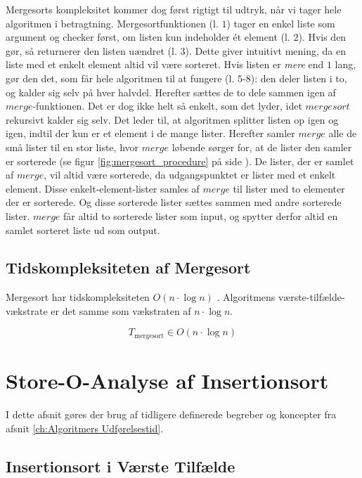 Mergesorts kompleksitet kommer dog først rigtigt til udtryk, når vi tager hele algoritmen i betragtning. Mergesortfunktionen (l. $1$) tager en enkel liste som argument og checker først, om listen kun indeholder ét element (l. $2$). Hvis den gør, så returnerer den listen uændret (l. $3$). Dette giver intuitivt mening, da en liste med et enkelt element altid vil være sorteret. Hvis listen er \emph{mere} end $1$ lang, gør den det, som får hele algoritmen til at fungere (l. $5$-$8$): den deler listen i to, og kalder sig selv på hver halvdel. Herefter sættes de to dele sammen igen af $merge$-funktionen. Det er dog ikke helt så enkelt, som det lyder, idet $mergesort$ rekursivt kalder sig selv. Det leder til, at algoritmen splitter listen op igen og igen, indtil der kun er et element i de mange lister. Herefter samler $merge$ alle de små lister til en stor liste, hvor $merge$ løbende sørger for, at de lister den samler er sorterede (se figur \ref{fig:mergesort_procedure} på side \pageref{fig:mergesort_procedure}). De lister, der er samlet af $merge$, vil altid være sorterede, da udgangspunktet er lister med et enkelt element. Disse enkelt-element-lister samles af $merge$ til lister med to elementer der er sorterede. Og disse sorterede lister sættes sammen med andre sorterede lister. $merge$ får altid to sorterede lister som input, og spytter derfor altid en samlet sorteret liste ud som output.





\subsection{Tidskompleksiteten af Mergesort}
\label{sec:Tidskompleksiteten af Mergesort}

Mergesort har tidskompleksiteten $O(n \cdot \log n)$ \cite{big-o-cheatsheet}. Algoritmens værste-tilfælde-vækstrate er det samme som vækstraten af $n \cdot \log n$.

$$T_{\text{mergesort}} \in O(n \cdot \log n)$$


\section{Store-O-Analyse af Insertionsort}
\label{sec:Analyse af Insertionsort}

I dette afsnit gøres der brug af tidligere definerede begreber og koncepter fra afsnit \ref{ch:Algoritmers Udførelsestid}.

\subsection{Insertionsort i Værste Tilfælde}%
\label{sub:Insertionsort i Værste Tilfælde}


